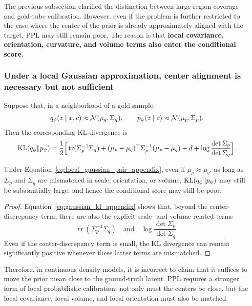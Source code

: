 The previous subsection clarified the distinction between large-region coverage and gold-tube calibration. However, even if the problem is further restricted to the case where the center of the prior is already approximately aligned with the target, PPL may still remain poor. The reason is that \textbf{local covariance, orientation, curvature, and volume terms also enter the conditional score.}

\subsubsection{Under a local Gaussian approximation, center alignment is necessary but not sufficient}

Suppose that, in a neighborhood of a gold sample,
\begin{equation}
q_{\phi}(z\mid x,c)\approx \mathcal{N}(\mu_q,\Sigma_q),
\qquad
p_{\psi}(z\mid c)\approx \mathcal{N}(\mu_p,\Sigma_p).
\label{eq:local_gaussian_pair_appendix}
\end{equation}
Then the corresponding KL divergence is
\begin{equation}
\mathrm{KL}(q_{\phi}\|p_{\psi})
=
\frac12
\Big[
\operatorname{tr}(\Sigma_p^{-1}\Sigma_q)
+(\mu_p-\mu_q)^{\top}\Sigma_p^{-1}(\mu_p-\mu_q)
-d
+\log\frac{\det\Sigma_p}{\det\Sigma_q}
\Big].
\label{eq:gaussian_kl_appendix}
\end{equation}

\begin{proposition}
\label{prop:center_alignment_not_sufficient_appendix}
Under Equation~\eqref{eq:local_gaussian_pair_appendix}, even if $\mu_p\approx\mu_q$, as long as $\Sigma_p$ and $\Sigma_q$ are mismatched in scale, orientation, or volume, $\mathrm{KL}(q_{\phi}\|p_{\psi})$ may still be substantially large, and hence the conditional score may still be poor.
\end{proposition}

\begin{proof}
Equation~\eqref{eq:gaussian_kl_appendix} shows that, beyond the center-discrepancy term, there are also the explicit scale- and volume-related terms
\[
\operatorname{tr}(\Sigma_p^{-1}\Sigma_q)
\quad\text{and}\quad
\log\frac{\det\Sigma_p}{\det\Sigma_q}.
\]
Even if the center-discrepancy term is small, the KL divergence can remain significantly positive whenever these latter terms are mismatched.
\end{proof}

Therefore, in continuous density models, it is incorrect to claim that it suffices to move the prior mean close to the ground-truth latent. PPL requires a stronger form of local probabilistic calibration: not only must the centers be close, but the local covariance, local volume, and local orientation must also be matched.

